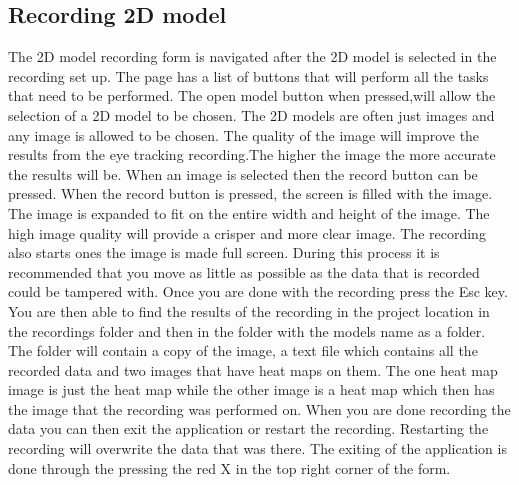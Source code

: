 \subsection{Recording 2D model}
The 2D model recording form is navigated after the 2D model is selected in the recording set up. The page has a list of buttons that will perform all the tasks that need to be performed. The open model button when pressed,will allow the selection of a 2D model to be chosen. The 2D models are often just images and any image is allowed to be chosen. The quality of the image will improve the results from the eye tracking recording.The higher the image the more accurate the results will be. When an image is selected then the record button can be pressed. When the record button is pressed, the screen is filled with the image. The image is expanded to fit on the entire width and height of the image. The high image quality will provide a crisper and more clear image. The recording also starts ones the image is made full screen. During this process it is recommended that you move as little as possible as the data that is recorded could be tampered with. Once you are done with the recording press the Esc key. You are then able to find the results of the recording in the project location in the recordings folder and then in the folder with the models name as a folder. The folder will contain a copy of the image, a text file which contains all the recorded data and two images that have heat maps on them. The one heat map image is just the heat map while the other image is a heat map which then has the image that the recording was performed on. When you are done recording the data you can then exit the application or restart the recording. Restarting the recording will overwrite the data that was there. The exiting of the application is done through the pressing the red X in the top right corner of the form.

